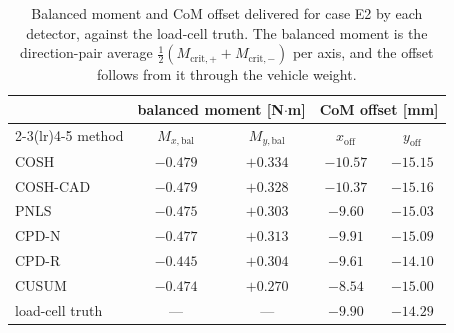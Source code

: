 \begin{table}[t]
\caption{Balanced moment and CoM offset delivered for case E2 by each detector, against the load-cell truth. The balanced moment is the direction-pair average $\tfrac12(M_{\mathrm{crit},+}+M_{\mathrm{crit},-})$ per axis, and the offset follows from it through the vehicle weight.}
\label{tab:e2_estimates}
\centering\small
\begin{tabular}{@{}lcccc@{}}
\toprule
& \multicolumn{2}{c}{balanced moment [N$\cdot$m]} & \multicolumn{2}{c}{CoM offset [mm]}\\
\cmidrule(lr){2-3}\cmidrule(lr){4-5}
method & $M_{x,\mathrm{bal}}$ & $M_{y,\mathrm{bal}}$ & $x_{\mathrm{off}}$ & $y_{\mathrm{off}}$\\
\midrule
COSH & $-0.479$ & $+0.334$ & $-10.57$ & $-15.15$\\
COSH-CAD & $-0.479$ & $+0.328$ & $-10.37$ & $-15.16$\\
PNLS & $-0.475$ & $+0.303$ & $-9.60$ & $-15.03$\\
CPD-N & $-0.477$ & $+0.313$ & $-9.91$ & $-15.09$\\
CPD-R & $-0.445$ & $+0.304$ & $-9.61$ & $-14.10$\\
CUSUM & $-0.474$ & $+0.270$ & $-8.54$ & $-15.00$\\
\midrule
load-cell truth & --- & --- & $-9.90$ & $-14.29$\\
\bottomrule
\end{tabular}
\end{table}
